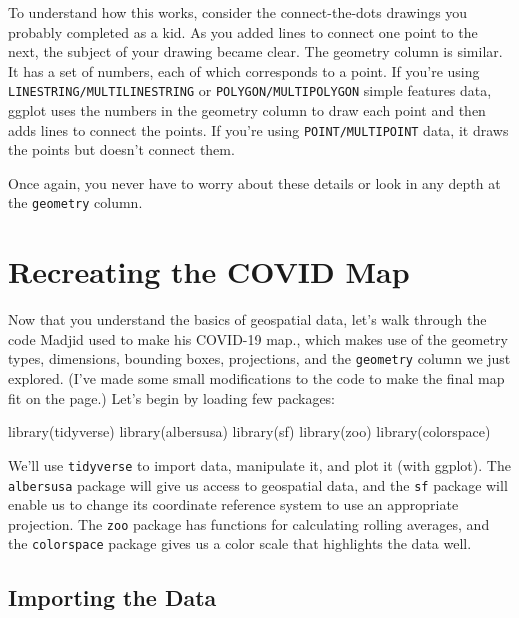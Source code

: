 \documentclass[
]{book}
\newenvironment{Shaded}{\begin{snugshade}}{\end{snugshade}}
\newcommand{\FunctionTok}[1]{\textcolor[rgb]{0.00,0.00,0.00}{#1}}
\newcommand{\NormalTok}[1]{#1}
\begin{document}
To understand how this works, consider the connect-the-dots drawings you probably completed as a kid. As you added lines to connect one point to the next, the subject of your drawing became clear. The geometry column is similar. It has a set of numbers, each of which corresponds to a point. If you're using \texttt{LINESTRING/MULTILINESTRING} or \texttt{POLYGON/MULTIPOLYGON} simple features data, ggplot uses the numbers in the geometry column to draw each point and then adds lines to connect the points. If you're using \texttt{POINT/MULTIPOINT} data, it draws the points but doesn't connect them.

Once again, you never have to worry about these details or look in any depth at the \texttt{geometry} column.

\hypertarget{recreating-the-covid-map}{%
\section*{Recreating the COVID Map}\label{recreating-the-covid-map}}

Now that you understand the basics of geospatial data, let's walk through the code Madjid used to make his COVID-19 map., which makes use of the geometry types, dimensions, bounding boxes, projections, and the \texttt{geometry} column we just explored. (I've made some small modifications to the code to make the final map fit on the page.) Let's begin by loading few packages:

\begin{Shaded}
\begin{Highlighting}[]
\FunctionTok{library}\NormalTok{(tidyverse)}
\FunctionTok{library}\NormalTok{(albersusa)}
\FunctionTok{library}\NormalTok{(sf)}
\FunctionTok{library}\NormalTok{(zoo)}
\FunctionTok{library}\NormalTok{(colorspace)}
\end{Highlighting}
\end{Shaded}

We'll use \texttt{tidyverse} to import data, manipulate it, and plot it (with ggplot). The \texttt{albersusa} package will give us access to geospatial data, and the \texttt{sf} package will enable us to change its coordinate reference system to use an appropriate projection. The \texttt{zoo} package has functions for calculating rolling averages, and the \texttt{colorspace} package gives us a color scale that highlights the data well.

\hypertarget{importing-the-data}{%
\subsection*{Importing the Data}\label{importing-the-data}}
\end{document}
